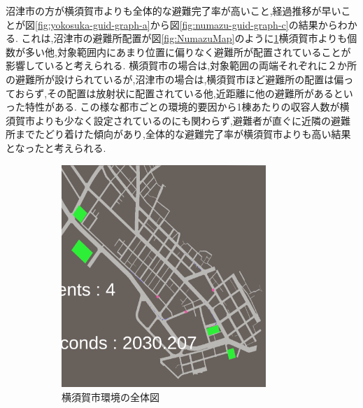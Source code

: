 沼津市の方が横須賀市よりも全体的な避難完了率が高いこと,経過推移が早いことが図\ref{fig:yokosuka-guid-graph-a}から図\ref{fig:numazu-guid-graph-c}の結果からわかる.
これは,沼津市の避難所配置が図\ref{fig:NumazuMap}のように\ref{fig:yokosukaMap}横須賀市よりも個数が多い他,対象範囲内にあまり位置に偏りなく避難所が配置されていることが影響していると考えられる.
横須賀市の場合は,対象範囲の両端それぞれに２か所の避難所が設けられているが,沼津市の場合は,横須賀市ほど避難所の配置は偏っておらず,その配置は放射状に配置されている他,近距離に他の避難所があるといった特性がある.
この様な都市ごとの環境的要因から1棟あたりの収容人数が横須賀市よりも少なく設定されているのにも関わらず,避難者が直ぐに近隣の避難所までたどり着けた傾向があり,全体的な避難完了率が横須賀市よりも高い結果となったと考えられる.
\begin{figure}[H]
  \centering
  \begin{subfigure}{0.45\textwidth}
      \centering
      \includegraphics[width=0.85\textwidth]{Figures/Yokosuka-Map.png}
      \caption{横須賀市環境の全体図}
      \label{fig:yokosukaMap}
  \end{subfigure}
  \begin{subfigure}{0.45\textwidth}
      \centering

\end{subfigure}
\end{figure}
